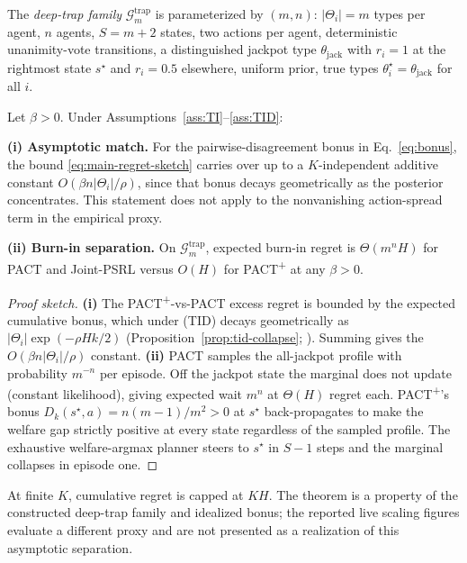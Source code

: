 The \emph{deep-trap family} $\mathcal G_m^{\mathrm{trap}}$ is parameterized by $(m,n)$: $|\Theta_i|=m$ types per agent, $n$ agents, $S = m+2$ states, two actions per agent, deterministic unanimity-vote transitions, a distinguished jackpot type $\theta_{\mathrm{jack}}$ with $r_i = 1$ at the rightmost state $s^\star$ and $r_i = 0.5$ elsewhere, uniform prior, true types $\theta_i^\star = \theta_{\mathrm{jack}}$ for all $i$.

\begin{theorem}
\label{thm:pact-plus-app}
Let $\beta > 0$. Under Assumptions~\ref{ass:TI}--\ref{ass:TID}:

\textbf{(i) Asymptotic match.} For the pairwise-disagreement bonus in Eq.~\eqref{eq:bonus}, the bound \eqref{eq:main-regret-sketch} carries over up to a $K$-independent additive constant $O(\beta n|\Theta_i|/\rho)$, since that bonus decays geometrically as the posterior concentrates. This statement does not apply to the nonvanishing action-spread term in the empirical proxy.

\textbf{(ii) Burn-in separation.} On $\mathcal G_m^{\mathrm{trap}}$, expected burn-in regret is $\Theta(m^n H)$ for PACT and Joint-PSRL versus $O(H)$ for PACT\textsuperscript{+} at any $\beta > 0$.
\end{theorem}

\begin{proof}[Proof sketch]
\textbf{(i)} The PACT\textsuperscript{+}-vs-PACT excess regret is bounded by the expected cumulative bonus, which under (TID) decays geometrically as $|\Theta_i|\exp(-\rho H k/2)$ (Proposition~\ref{prop:tid-collapse}; \citealp{ghosal2017fundamentals}). Summing gives the $O(\beta n|\Theta_i|/\rho)$ constant. \textbf{(ii)} PACT samples the all-jackpot profile with probability $m^{-n}$ per episode. Off the jackpot state the marginal does not update (constant likelihood), giving expected wait $m^n$ at $\Theta(H)$ regret each. PACT\textsuperscript{+}'s bonus $D_k(s^\star,a) = n(m-1)/m^2 > 0$ at $s^\star$ back-propagates to make the welfare gap strictly positive at every state regardless of the sampled profile. The exhaustive welfare-argmax planner steers to $s^\star$ in $S{-}1$ steps and the marginal collapses in episode one.
\end{proof}

At finite $K$, cumulative regret is capped at $KH$. The theorem is a property of the constructed deep-trap family and idealized bonus; the reported live scaling figures evaluate a different proxy and are not presented as a realization of this asymptotic separation.

